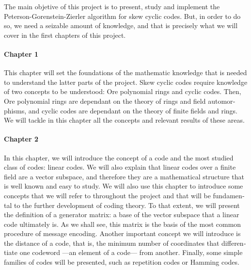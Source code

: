 \begin{otherlanguage}{english}

The main objetive of this project is to present, study and implement the Peterson-Gorenstein-Zierler algorithm for skew cyclic codes.
But, in order to do so, we need a seizable amount of knowledge, and that is precisely what we will cover in the first chapters of this project.

\paragraph{Chapter 1} This chapter will set the foundations of the mathematic knowledge that is needed to understand the latter parts of the project. 
Skew cyclic codes require knowledge of two concepts to be understood: Ore polynomial rings and cyclic codes.
Then, Ore polynomial rings are dependant on the theory of rings and field automorphisms, and cyclic codes are dependant on the theory of finite fields and rings.
We will tackle in this chapter all the concepts and relevant results of these areas.

\paragraph{Chapter 2} In this chapter, we will introduce the concept of a code and the most studied class of codes: linear codes.
We will also explain that linear codes over a finite field are a vector subspace, and therefore they are a mathematical structure that is well known and easy to study.
We will also use this chapter to introduce some concepts that we will refer to throughout the project and that will be fundamental to the further development of coding theory.
To that extent, we will present the definition of a generator matrix: a base of the vector subspace that a linear code ultimately is.
As we shall see, this matrix is the basis of the most common procedure of message encoding.
Another important concept we will introduce is the distance of a code, that is, the minimum number of coordinates that differentiate one codeword —an element of a code— from another.
Finally, some simple families of codes will be presented, such as repetition codes or Hamming codes.


\end{otherlanguage}
